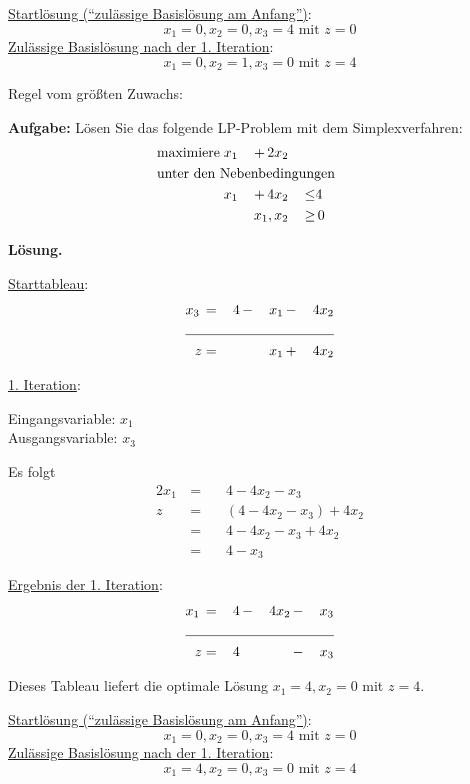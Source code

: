 \documentclass[10pt,a4paper,oneside,ngerman,numbers=noenddot]{scrartcl}
\begin{document}
		\underline{Startlösung ("`zulässige Basislösung am Anfang"')}:
		\[
			x_{1} = 0, x_{2} = 0, x_{3} = 4 \text{ mit } z = 0
		\]
		\underline{Zulässige Basislösung nach der 1. Iteration}:
		\[
			x_{1} = 0, x_{2} = 1, x_{3} = 0 \text{ mit } z = 4
		\]			
				
			Regel vom größten Zuwachs:
			
			\textbf{Aufgabe:} Lösen Sie das folgende LP-Problem mit dem Simplexverfahren:
		\begin{alignat*}{3}
			\text{maximiere}\; & x_{1} \,&+&\, 2x_{2} && \\
			\multicolumn{6}{l}{\text{unter den Nebenbedingungen}} && \\
			\;& x_{1} \,&+&\, 4x_{2} \,&\leq & 4 \\
			\multicolumn{4}{r}{$x_{1}, x_{2}$} \,&\geq &\, 0
		\end{alignat*}
		
		\textbf{Lösung.}
		
		\underline{Starttableau}:
		\begin{alignat*}{4}
			x_{3} \,&=&\, 4 \,&-&\, x_{1} \,&-&\, 4x_{2} \\ \cline{1 - 7}
			z &=& &&\, x_{1} \,&+&\, 4x_{2}
		\end{alignat*}
		
		\underline{1. Iteration}:
		
		Eingangsvariable: $x_{1}$\\
		Ausgangsvariable: $x_{3}$
		
		Es folgt
		\begin{alignat*}{2}
			x_{1} \,&=&&\, 4 - 4x_{2}  - x_{3} \\
			z \,&=&&\, \left(4 - 4x_{2}  - x_{3}\right) + 4x_{2} \\
			&=&&\, 4 - 4x_{2}  - x_{3} + 4x_{2} \\
			&=&&\, 4 - x_{3}
		\end{alignat*}
		
		\underline{Ergebnis der 1. Iteration}:
		\begin{alignat*}{4}
			x_{1} \,&=&\, 4 \,&-&\, 4x_{2} \,&-&\, x_{3} \\ \cline{1 - 7}
			z &=& 4 \,&& &-&\, x_{3}
		\end{alignat*}
		
		Dieses Tableau liefert die optimale Lösung $x_{1} = 4, x_{2} = 0$ mit $z = 4$.
		
		\underline{Startlösung ("`zulässige Basislösung am Anfang"')}:
		\[
			x_{1} = 0, x_{2} = 0, x_{3} = 4 \text{ mit } z = 0
		\]
		\underline{Zulässige Basislösung nach der 1. Iteration}:
		\[
			x_{1} = 4, x_{2} = 0, x_{3} = 0 \text{ mit } z = 4
		\]
		
\end{document}
